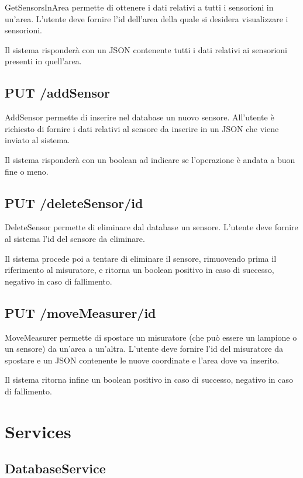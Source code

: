 GetSensorsInArea permette di ottenere i dati relativi a tutti i sensorioni in un'area. L'utente deve fornire l'id dell'area della quale si desidera visualizzare i sensorioni.

Il sistema risponderà con un JSON contenente tutti i dati relativi ai sensorioni presenti in quell'area.

\subsection{ PUT /addSensor}

AddSensor permette di inserire nel database un nuovo sensore. All'utente è richiesto di fornire i dati relativi al sensore da inserire in un JSON che viene inviato al sistema.

Il sistema risponderà con un boolean ad indicare se l'operazione è andata a buon fine o meno.

\subsection{ PUT /deleteSensor/id}

DeleteSensor permette di eliminare dal database un sensore. L'utente deve fornire al sistema l'id del sensore da eliminare.

Il sistema procede poi a tentare di eliminare il sensore, rimuovendo prima il riferimento al misuratore, e ritorna un boolean positivo in caso di successo, negativo in caso di fallimento.

\subsection { PUT /moveMeasurer/id}

MoveMeasurer permette di spostare un misuratore (che può essere un lampione o un sensore) da un'area a un'altra. L'utente deve fornire l'id del misuratore da spostare e un JSON contenente le nuove coordinate e l'area dove va inserito.

Il sistema ritorna infine un boolean positivo in caso di successo, negativo in caso di fallimento.

\section{Services}
\subsection{DatabaseService}

